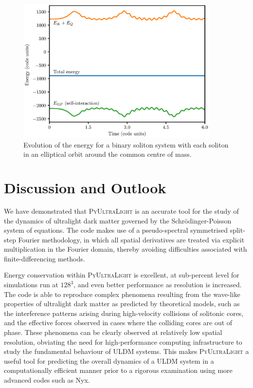 \documentclass[a4paper,11pt]{article}
\newcommand{\PyUltraLight}{\textsc{PyUltraLight }}
\begin{document}
\begin{figure}
  \includegraphics[width=0.9\textwidth,trim=0 0 2cm 2cm,clip]{egy_m=22.eps}
  \caption{Evolution of the energy for a binary soliton system with each soliton in an elliptical orbit around the common centre of mass.}
  \label{fig:binary}
\end{figure}





\section{Discussion and Outlook}

We have demonstrated that \PyUltraLight is an accurate tool for the study of the dynamics of ultralight dark matter governed by the Schr{\"o}dinger-Poisson system of equations. The code makes use of a pseudo-spectral symmetrised split-step Fourier methodology, in which all spatial derivatives are treated via explicit multiplication in the Fourier domain, thereby avoiding difficulties associated with finite-differencing methods. 

Energy conservation within \PyUltraLight is excellent, at sub-percent level for simulations run at $128^3$, and even better performance as resolution is increased. The code is able to reproduce complex phenomena resulting from the wave-like properties of ultralight dark matter as predicted by theoretical models, such as the interference patterns arising during high-velocity collisions of solitonic cores, and the effective forces observed in cases where the colliding cores are out of phase. These phenomena can be clearly observed at relatively low spatial resolution, obviating the need for high-performance computing infrastructure to study the fundamental behaviour of ULDM systems. This makes \PyUltraLight a useful tool for predicting the overall dynamics of a ULDM system in a computationally efficient manner prior to a rigorous examination using more advanced codes such as Nyx.
\end{document}
